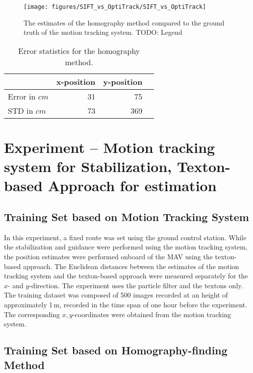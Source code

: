 \documentclass{report}
\begin{document}
\begin{figure}[h!]
\begin{center}
\texttt{[image: figures/SIFT\_vs\_OptiTrack/SIFT\_vs\_OptiTrack]}
\caption{{\label{fig:flightpath} The estimates of the homography
    method compared to the ground truth of the motion tracking system.
    TODO: Legend%
  }}
\end{center}
\end{figure}

\begin{table}[H]
  \centering
  \begin{tabular}{lrrr}
    \toprule
    & x-position & y-position\\
    \midrule
    Error in $cm$ & 31 & 75\\
    STD in $cm$ & 73 & 369\\
    \bottomrule
  \end{tabular}
  \caption[Error statistics homography method]{Error statistics for the homography method.}
  \label{tab:homoerror}
\end{table}


\section{Experiment -- Motion tracking system for Stabilization,
  Texton-based Approach for estimation}

\subsection{Training Set based on Motion Tracking System}
\label{sec:experiment-real}

In this experiment, a fixed route was set using the ground control
station. While the stabilization and guidance were performed using the
motion tracking system, the position estimates were performed onboard
of the MAV using the texton-based approach. The Euclidean distances
between the estimates of the motion tracking system and the
texton-based approach were measured separately for the $x$- and
$y$-direction. The experiment uses the particle filter and the textons
only. The training dataset was composed of 500 images recorded at an
height of approximately 1\,m, recorded in the time span of one hour
before the experiment. The corresponding $x,y$-coordinates were
obtained from the motion tracking system.

\subsection{Training Set based on Homography-finding Method}
\label{sec:traininghomo}
\end{document}
